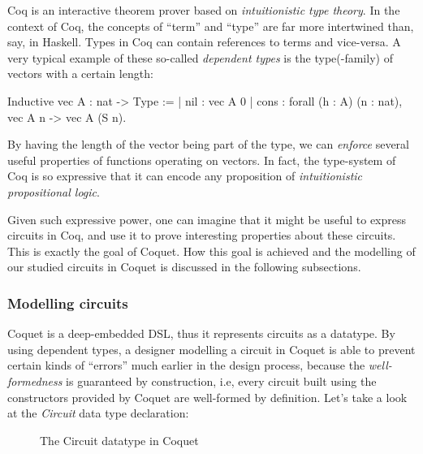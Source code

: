 \documentclass[a4paper]{article}
\begin{document}
            Coq is an interactive theorem prover based on \emph{intuitionistic type theory}. In the
            context of Coq, the concepts of ``term'' and ``type'' are far more intertwined than,
            say, in Haskell. Types in Coq can contain references to terms and vice-versa. A very
            typical example of these so-called \emph{dependent types} is the type(-family) of
            vectors with a certain length:

            \begin{coqcode}
        Inductive vec A : nat -> Type :=
            | nil  : vec A 0
            | cons : forall (h : A) (n : nat),  vec A n -> vec A (S n).
            \end{coqcode}

            By having the length of the vector being part of the type, we can \emph{enforce} several
            useful properties of functions operating on vectors. In fact, the type-system of Coq is
            so expressive that it can encode any proposition of \emph{intuitionistic propositional
                logic}.

            Given such expressive power, one can imagine that it might be useful to express circuits
            in Coq, and use it to prove interesting properties about these circuits. This is exactly
            the goal of Coquet. How this goal is achieved and the modelling of our studied circuits
            in Coquet is discussed in the following subsections.

            \subsubsection{Modelling circuits}
            \label{subsubsec:coquet-modelling}
                Coquet is a deep-embedded DSL, thus it represents circuits as a datatype. By using
                dependent types, a designer modelling a circuit in Coquet is able to prevent certain
                kinds of ``errors'' much earlier in the design process, because the
                \emph{well-formedness} is guaranteed by construction, i.e, every circuit built using
                the constructors provided by Coquet are well-formed by definition. Let's take a look
                at the \emph{Circuit} data type declaration:

                \begin{figure}[h!]
                    \begin{center}
                    \end{center}
                    \caption{The Circuit datatype in Coquet
                        \label{fig:coquet-circuit-type}}
                \end{figure}
\end{document}
